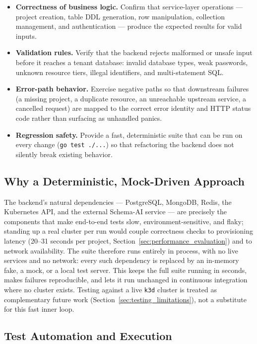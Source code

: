 \begin{itemize}
    \item \textbf{Correctness of business logic.} Confirm that service-layer operations --- project creation, table DDL generation, row manipulation, collection management, and authentication --- produce the expected results for valid inputs.
    \item \textbf{Validation rules.} Verify that the backend rejects malformed or unsafe input before it reaches a tenant database: invalid database types, weak passwords, unknown resource tiers, illegal identifiers, and multi-statement SQL.
    \item \textbf{Error-path behavior.} Exercise negative paths so that downstream failures (a missing project, a duplicate resource, an unreachable upstream service, a cancelled request) are mapped to the correct error identity and HTTP status code rather than surfacing as unhandled panics.
    \item \textbf{Regression safety.} Provide a fast, deterministic suite that can be run on every change (\texttt{go test ./...}) so that refactoring the backend does not silently break existing behavior.
\end{itemize}

\subsection{Why a Deterministic, Mock-Driven Approach}

The backend's natural dependencies --- PostgreSQL, MongoDB, Redis, the Kubernetes API, and the external Schema-AI service --- are precisely the components that make end-to-end tests slow, environment-sensitive, and flaky; standing up a real cluster per run would couple correctness checks to provisioning latency (20--31 seconds per project, Section~\ref{sec:performance_evaluation}) and to network availability. The suite therefore runs entirely in process, with no live services and no network: every such dependency is replaced by an in-memory fake, a mock, or a local test server. This keeps the full suite running in seconds, makes failures reproducible, and lets it run unchanged in continuous integration where no cluster exists. Testing against a live \texttt{k3d} cluster is treated as complementary future work (Section~\ref{sec:testing_limitations}), not a substitute for this fast inner loop.

\subsection{Test Automation and Execution}
\label{sec:test_automation}


